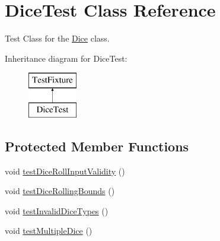 \hypertarget{class_dice_test}{}\section{Dice\+Test Class Reference}
\label{class_dice_test}


Test Class for the \hyperlink{class_dice}{Dice} class.  


Inheritance diagram for Dice\+Test\+:\begin{figure}[H]
\begin{center}
\leavevmode
\includegraphics[height=2.000000cm]{class_dice_test}
\end{center}
\end{figure}
\subsection*{Protected Member Functions}
\begin{DoxyCompactItemize}
\item 
void \hyperlink{class_dice_test_a3e9f2421e914d4f18de2327828345860}{test\+Dice\+Roll\+Input\+Validity} ()
\item 
void \hyperlink{class_dice_test_a365b7b1d1ffe9faac8f306de9944d173}{test\+Dice\+Rolling\+Bounds} ()
\item 
void \hyperlink{class_dice_test_ac46b7044f229250c84b8dafaf432c80d}{test\+Invalid\+Dice\+Types} ()
\item 
void \hyperlink{class_dice_test_a849ab553a12a5a5d4deec59ddd1edf30}{test\+Multiple\+Dice} ()
\end{DoxyCompactItemize}
